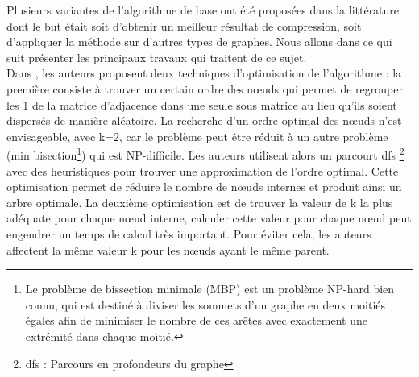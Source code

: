 Plusieurs variantes de l'algorithme de base ont été proposées dans la littérature dont le but était soit d'obtenir un meilleur résultat de compression, soit d'appliquer la méthode sur d'autres types de graphes. Nous allons dans ce qui suit présenter les principaux travaux qui traitent de ce sujet.\\

Dans \citep{shi2012optimizing}, les auteurs proposent deux techniques d'optimisation de l'algorithme : la première consiste à trouver un certain ordre des nœuds qui permet de regrouper les 1 de la matrice d'adjacence dans une seule sous matrice au lieu qu'ils soient dispersés de manière aléatoire. La recherche d'un ordre optimal des nœuds n'est envisageable, avec k=2, car le problème peut être réduit à un autre problème (min bisection\footnote{Le problème de bissection minimale (MBP) est un problème NP-hard bien connu, qui est destiné à diviser les sommets d'un graphe en deux moitiés égales afin de minimiser le nombre de ces arêtes avec exactement une extrémité dans chaque moitié.}) qui est NP-difficile. Les auteurs utilisent alors un parcourt \gls{dfs}
\footnote{\gls{dfs} : Parcours en profondeurs du graphe}
 avec des heuristiques pour trouver une approximation de l'ordre optimal. Cette optimisation permet de réduire le nombre de nœuds internes et produit ainsi un arbre optimale. La deuxième optimisation est de trouver la valeur de k la plus adéquate pour chaque nœud interne, calculer cette valeur pour chaque nœud peut engendrer un temps de calcul très important. Pour éviter cela, les auteurs affectent la même valeur k pour les nœuds ayant le même parent. 	

